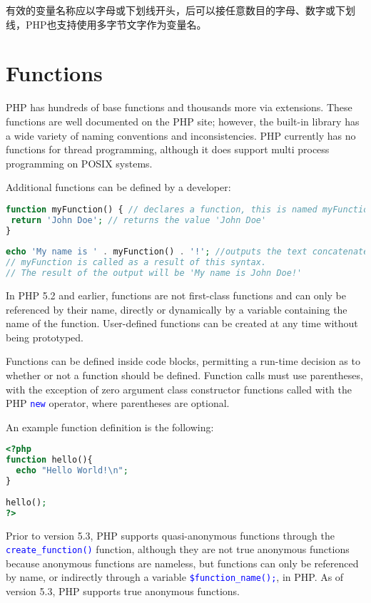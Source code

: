 有效的变量名称应以字母或下划线开头，后可以接任意数目的字母、数字或下划线，PHP也支持使用多字节文字作为变量名。




\chapter{Functions}

PHP has hundreds of base functions and thousands more via extensions. These functions are well documented on the PHP site; however, the built-in library has a wide variety of naming conventions and inconsistencies. PHP currently has no functions for thread programming, although it does support multi process programming on POSIX systems.

Additional functions can be defined by a developer:


\begin{lstlisting}[language=PHP]
function myFunction() { // declares a function, this is named myFunction
 return 'John Doe'; // returns the value 'John Doe'
}
 
echo 'My name is ' . myFunction() . '!'; //outputs the text concatenated with the return value of myFunction.
// myFunction is called as a result of this syntax.
// The result of the output will be 'My name is John Doe!'
\end{lstlisting}

In PHP 5.2 and earlier, functions are not first-class functions and can only be referenced by their name, directly or dynamically by a variable containing the name of the function. User-defined functions can be created at any time without being prototyped. 

Functions can be defined inside code blocks, permitting a run-time decision as to whether or not a function should be defined. Function calls must use parentheses, with the exception of zero argument class constructor functions called with the PHP \textcolor{Blue}{\texttt{new}} operator, where parentheses are optional. 

An example function definition is the following:

\begin{lstlisting}[language=PHP]
<?php
function hello(){
  echo "Hello World!\n";
}
 
hello();
?>
\end{lstlisting}

Prior to version 5.3, PHP supports quasi-anonymous functions through the \textcolor{Blue}{\texttt{create\_function()}} function, although they are not true anonymous functions because anonymous functions are nameless, but functions can only be referenced by name, or indirectly through a variable \textcolor{Blue}{\texttt{\$function\_name();}}, in PHP. As of version 5.3, PHP supports true anonymous functions.


